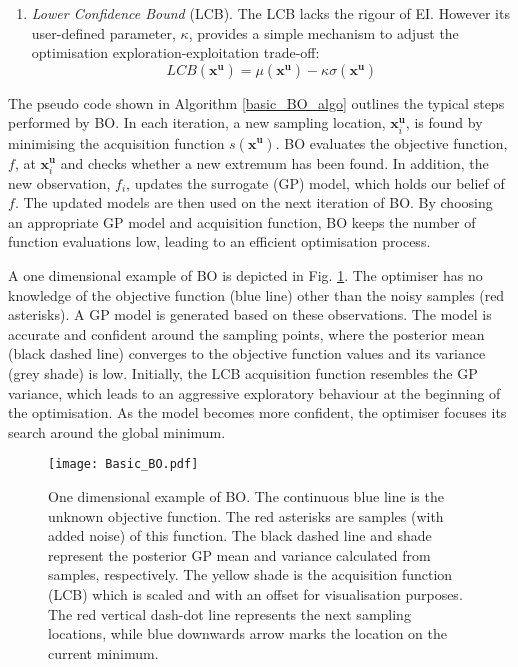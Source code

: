 \documentclass[shortAfour,sageh,times]{sagej_no_sage}
\begin{document}
\begin{enumerate}
	\item \textit{Lower Confidence Bound} (LCB).
	The LCB lacks the rigour of EI. However its user-defined parameter, $\kappa$, provides a simple mechanism to adjust the optimisation exploration-exploitation trade-off:
	\begin{equation}\label{LCB}
		LCB(\boldsymbol{x}^{\boldsymbol{u}})=\mu(\boldsymbol{x}^{\boldsymbol{u}})-\kappa\sigma(\boldsymbol{x}^{\boldsymbol{u}})
	\end{equation}
\end{enumerate}

The pseudo code shown in Algorithm \ref{basic_BO_algo} outlines the typical steps performed by BO. In each iteration, a new sampling location, $\boldsymbol{x}^{\boldsymbol{u}}_i$, is found by minimising the acquisition function $s(\boldsymbol{x}^{\boldsymbol{u}})$. BO evaluates the objective function, $f$, at  $\boldsymbol{x}^{\boldsymbol{u}}_i$ and checks whether a new extremum has been found. In addition, the new observation, $f_i$, updates the surrogate (GP) model, which holds our belief of $f$. The updated models are then used on the next iteration of BO. By choosing an appropriate GP model and acquisition function, BO keeps the number of function evaluations low, leading to an efficient optimisation process. 

A one dimensional example of BO is depicted in Fig. \ref{basic_bo_fig}. The optimiser has no knowledge of the objective function (blue line) other than the noisy samples (red asterisks). A GP model is generated based on these observations. The model is accurate and confident around the sampling points, where the posterior mean (black dashed line) converges to the objective function values and its variance (grey shade) is low. Initially, the LCB acquisition function resembles the GP variance, which leads to an aggressive exploratory behaviour at the beginning of the optimisation. As the model becomes more confident, the optimiser focuses its search around the global minimum.

\begin{figure}[bt]

 \centering
 
 \texttt{[image: Basic\_BO.pdf]}
 
 \caption{One dimensional example of BO. The continuous blue line is the unknown objective function. The red asterisks are samples (with added noise) of this function. The black dashed line and shade represent the posterior GP mean and variance calculated from samples, respectively. The yellow shade is the acquisition function (LCB) which is scaled and with an offset for visualisation purposes. The red vertical dash-dot line represents the next sampling locations, while blue downwards arrow marks the location on the current minimum. }
 \label{basic_bo_fig}
\end{figure}
\end{document}
